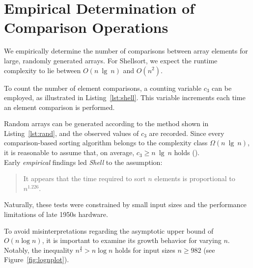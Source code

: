 \section{Empirical Determination of Comparison Operations}

We empirically determine the number of comparisons between array elements for large, randomly generated arrays.
For Shellsort, we expect the runtime complexity to lie between $O(n\ \lg\ n)$ and $O(n^2)$.

To count the number of element comparisons, a counting variable $c_3$ can be employed, as illustrated in Listing~\ref{lst:shell}.
This variable increments each time an element comparison is performed.

Random arrays can be generated according to the method shown in Listing~\ref{lst:rand}, and the observed values of $c_3$ are recorded.
Since every comparison-based sorting algorithm belongs to the complexity class $\Omega(n\ \lg\ n)$, it is reasonable to assume that, on average, $c_3 \geq n\ \lg\ n$ holds (\cite[154]{OW17b}).\\









Early \textit{empirical} findings led \textit{Shell} to the assumption:

\blockquote[{\cite[31]{She59}}]{It appears that the time required to sort $n$ elements is proportional to $n^{1.226}$.
}

Naturally, these tests were constrained by small input sizes and the performance limitations of late 1950s hardware.

To avoid misinterpretations regarding the asymptotic upper bound of $O(n \log n)$, it is important to examine its growth behavior for varying $n$.
Notably, the inequality $n^{\frac{4}{3}} > n \log n$ holds for input sizes $n \geq 982$ (see Figure~\ref{fig:lognplot}).

